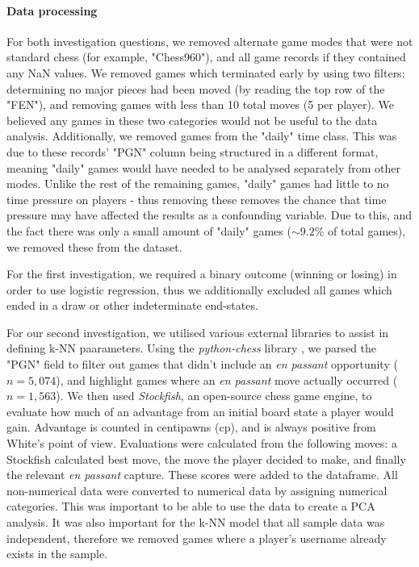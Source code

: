 \documentclass[10pt,a4paper]{article}
\begin{document}
\begin{multicols}{2}
\paragraph{Data processing}
For both investigation questions, we removed alternate game modes that were not standard chess (for example, "Chess960"), and all game records if they contained any NaN values. We removed games which terminated early by using two filters: determining no major pieces had been moved (by reading the top row of the "FEN"), and removing games with less than 10 total moves (5 per player). We believed any games in these two categories would not be useful to the data analysis. Additionally, we removed games from the "daily" time class. This was due to these records' "PGN" column being structured in a different format, meaning "daily" games would have needed to be analysed separately from other modes. Unlike the rest of the remaining games, "daily" games had little to no time pressure on players - thus removing these removes the chance that time pressure may have affected the results as a confounding variable. Due to this, and the fact there was only a small amount of "daily" games ($\sim9.2\%$ of total games), we removed these from the dataset.\newline

For the first investigation, we required a binary outcome (winning or losing) in order to use logistic regression, thus we additionally excluded all games which ended in a draw or other indeterminate end-states. \newline

For our second investigation, we utilised various external libraries to assist in defining k-NN paarameters. Using the \textit{python-chess} library \cite{python-chess}, we parsed the "PGN" field to filter out games that didn't include an \textit{en passant} opportunity ($n=5,074$), and highlight games where an \textit{en passant} move actually occurred ($n=1,563$). We then used \textit{Stockfish}\cite{StockFish}, an open-source chess game engine, to evaluate how much of an advantage from an initial board state a player would gain. Advantage is counted in centipawns (cp), and is always positive from White's point of view. Evaluations were calculated from the following moves: a Stockfish calculated best move, the move the player decided to make, and finally the relevant \textit{en passant} capture. These scores were added to the dataframe. All non-numerical data were converted to numerical data by assigning numerical categories. This was important to be able to use the data to create a PCA analysis. It was also important for the k-NN model that all sample data was independent, therefore we removed games where a player's username already exists in the sample.\newline



\end{multicols}
\end{document}
